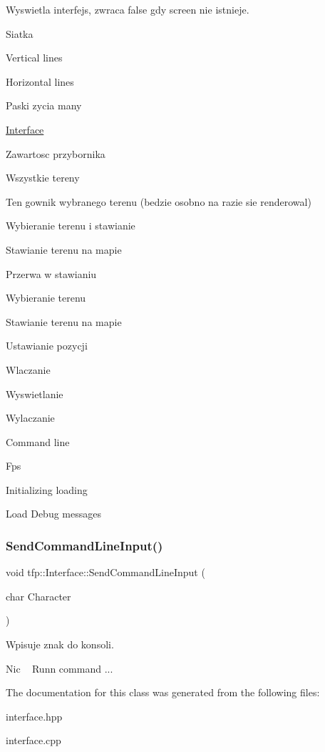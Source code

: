Wyswietla interfejs, zwraca false gdy screen nie istnieje. 

Siatka

Vertical lines

Horizontal lines

Paski zycia many

\mbox{\hyperlink{classtfp_1_1_interface}{Interface}}

Zawartosc przybornika

Wszystkie tereny

Ten gownik wybranego terenu (bedzie osobno na razie sie renderowal)

Wybieranie terenu i stawianie

Stawianie terenu na mapie

Przerwa w stawianiu

Wybieranie terenu

Stawianie terenu na mapie

Ustawianie pozycji

Wlaczanie

Wyswietlanie

Wylaczanie

Command line

Fps

Initializing loading

Load Debug messages \mbox{\label{classtfp_1_1_interface_a9d663b1162c4b165491a66cf8c55edc9}} 
\subsubsection{\texorpdfstring{Send\+Command\+Line\+Input()}{SendCommandLineInput()}}
{\footnotesize\ttfamily void tfp\+::\+Interface\+::\+Send\+Command\+Line\+Input (\begin{DoxyParamCaption}\item[{char}]{Character }\end{DoxyParamCaption})}



Wpisuje znak do konsoli. 

Nic ~\newline
 Runn command ... 

The documentation for this class was generated from the following files\+:\begin{DoxyCompactItemize}
\item 
interface.\+hpp\item 
interface.\+cpp\end{DoxyCompactItemize}
